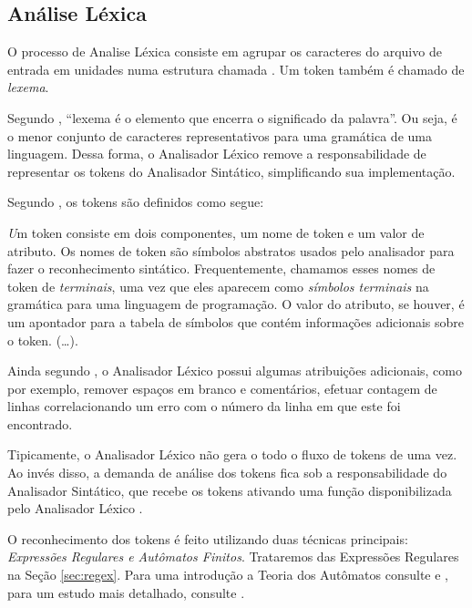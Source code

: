 \subsection{Análise Léxica}

O processo de Analise Léxica consiste em agrupar os caracteres do arquivo de
entrada em unidades numa estrutura chamada \token. Um token também é chamado
de \emph{lexema}.

Segundo , ``lexema é o elemento que encerra o
significado da palavra''. Ou seja, é o menor conjunto de caracteres
representativos para uma gramática de uma linguagem. Dessa forma, o Analisador
Léxico remove a responsabilidade de representar os tokens do Analisador
Sintático, simplificando sua implementação.

Segundo , os tokens são definidos como segue:

\begin{citacao}{4cm}{0cm}\footnotesize \emph
	Um token consiste em dois componentes, um nome de token e um valor de
	atributo. Os nomes de token são símbolos abstratos usados pelo analisador para
	fazer o reconhecimento sintático. Frequentemente, chamamos esses nomes de
	token de \emph{terminais}, uma vez que eles aparecem como \emph{símbolos
	terminais} na gramática para uma linguagem de programação. O valor do
	atributo, se houver, é um apontador para a tabela de símbolos que contém
	informações adicionais sobre o token. (\ldots).
\end{citacao}

Ainda segundo , o Analisador Léxico possui algumas
atribuições adicionais, como por exemplo, remover espaços em branco e
comentários, efetuar contagem de linhas correlacionando um erro com o número
da linha em que este foi encontrado.

Tipicamente, o Analisador Léxico não gera o todo o fluxo de tokens de uma vez.
Ao invés disso, a demanda de análise dos tokens fica sob a responsabilidade do
Analisador Sintático, que recebe os tokens ativando uma função disponibilizada
pelo Analisador Léxico \cite{louden97-pt}.

O reconhecimento dos tokens é feito utilizando duas técnicas principais:
\emph{Expressões Regulares e Autômatos Finitos}. Trataremos das Expressões
Regulares na Seção \ref{sec:regex}. Para uma introdução a Teoria dos Autômatos
consulte  e  , para um estudo
mais detalhado, consulte .

